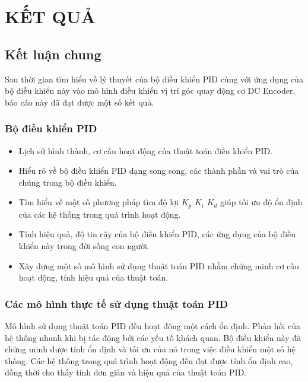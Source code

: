 
\chapter{KẾT QUẢ} %

\label{Chapter3} %





\section{Kết luận chung}
Sau thời gian tìm hiểu về lý thuyết của bộ điều khiển PID cùng với ứng dụng của bộ điều khiển này vào mô hình điều khiển vị trí góc quay động cơ DC Encoder, báo cáo này đã đạt được một số kết quả. 

\subsection{Bộ điều khiển PID}
\begin{itemize}
	\item Lịch sử hình thành, cơ cấu hoạt động của thuật toán điều khiển PID.	
	\item Hiểu rõ về bộ điều khiển PID dạng song song, các thành phần và vai trò của chúng trong bộ điều khiển.
	\item Tìm hiểu về một số phương pháp tìm độ lợi $K_p$ $K_i$ $K_d$ giúp tối ưu độ ổn định của các hệ thống trong quá trình hoạt động.
	\item Tính hiệu quả, độ tin cậy của bộ điều khiển PID, các ứng dụng của bộ điều khiển này trong đời sống con người.
	\item Xây dựng một số mô hình sử dụng thuật toán PID nhằm chứng minh cơ cấu hoạt động, tính hiệu quả của thuật toán.
\end{itemize}

\subsection{Các mô hình thực tế sử dụng thuật toán PID}
Mô hình sử dụng thuật toán PID đều hoạt động một cách ổn định. Phản hồi của hệ thống nhanh khi bị tác động bởi các yếu tố khách quan. Bộ điều khiển này đã chứng minh được tính ổn định và tối ưu của nó trong việc điều khiển một số hệ thống. Các hệ thống trong quá trình hoạt động đều đạt được tính ổn định cao, đồng thời cho thấy tính đơn giản và hiệu quả của thuật toán PID.
\newpage
